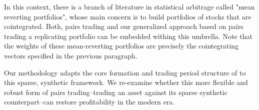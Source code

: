 In this context, there is a branch of literature in statistical arbitrage called "mean reverting portfolios", whose main concern is to build portfolios of stocks that are cointegrated. Both, pairs trading and our generalized approach based on pairs trading a replicating portfolio can be embedded withing this umbrella. Note that the weights of these mean-reverting portfolios are precisely the cointegrating vectors specified in the previous paragraph.

Our methodology adapts the core formation and trading period structure of \cite{Gatev2006} to this sparse, synthetic framework. We re-examine whether this more flexible and robust form of pairs trading--trading an asset against its sparse synthetic counterpart--can restore profitability in the modern era.


